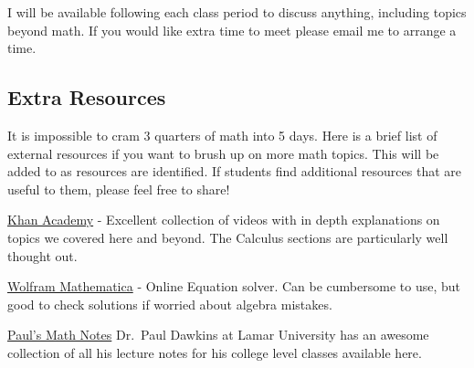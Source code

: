 \documentclass[
  letterpaper,
  DIV=11,
  numbers=noendperiod]{scrartcl}
\begin{document}
I will be available following each class period to discuss anything,
including topics beyond math. If you would like extra time to meet
please email me to arrange a time.

\subsection{Extra Resources}\label{extra-resources}

It is impossible to cram 3 quarters of math into 5 days. Here is a brief
list of external resources if you want to brush up on more math topics.
This will be added to as resources are identified. If students find
additional resources that are useful to them, please feel free to share!

\href{https://www.khanacademy.org/}{Khan Academy} - Excellent collection
of videos with in depth explanations on topics we covered here and
beyond. The Calculus sections are particularly well thought out.

\href{https://www.wolfram.com/mathematica/}{Wolfram Mathematica} -
Online Equation solver. Can be cumbersome to use, but good to check
solutions if worried about algebra mistakes.

\href{https://tutorial.math.lamar.edu/}{Paul's Math Notes} Dr.~Paul
Dawkins at Lamar University has an awesome collection of all his lecture
notes for his college level classes available here.
\end{document}
